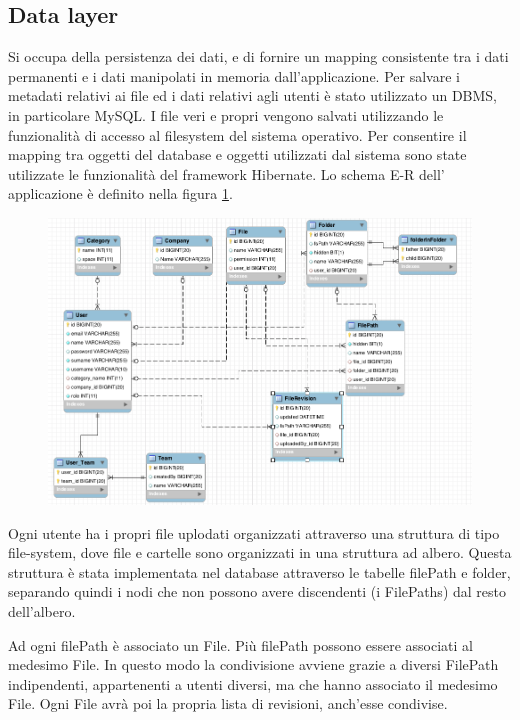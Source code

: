 \subsection{Data layer}

Si occupa della persistenza dei dati, e di fornire un mapping
consistente tra i dati permanenti e i dati manipolati in memoria
dall'applicazione. Per salvare i metadati relativi ai file ed i dati
relativi agli utenti è stato utilizzato un DBMS, in particolare
MySQL. I file veri e propri vengono salvati utilizzando le
funzionalità di accesso al filesystem del sistema operativo. Per
consentire il mapping tra oggetti del database e oggetti utilizzati
dal sistema sono state utilizzate le funzionalità del framework
Hibernate.
Lo schema E-R dell' applicazione è definito nella
figura \ref{ER}. 

\begin{figure}
  \includegraphics[scale=0.4]{er}
  \caption{}
  \label{ER}
\end{figure}


Ogni utente ha i propri file uplodati organizzati attraverso una
struttura di tipo file-system, dove file e cartelle sono organizzati
in una struttura ad albero. Questa struttura è stata implementata nel
database attraverso le tabelle filePath e folder, separando quindi i
nodi che non possono avere discendenti (i FilePaths) dal resto
dell'albero.

Ad ogni filePath è associato un File. Più filePath possono essere
associati al medesimo File. In questo modo la condivisione avviene
grazie a diversi FilePath indipendenti, appartenenti a utenti diversi, ma
che hanno associato il medesimo File. Ogni File avrà poi la propria
lista di revisioni, anch'esse condivise.

